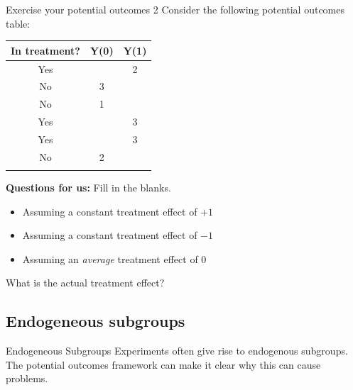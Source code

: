\documentclass[
  11pt,
  ignorenonframetext,
]{beamer}
\providecommand{\tightlist}{%
  \setlength{\itemsep}{0pt}\setlength{\parskip}{0pt}}\usepackage{longtable,booktabs,array}
\begin{document}
\begin{frame}{Exercise your potential outcomes 2}
\protect\hypertarget{exercise-your-potential-outcomes-2}{}
Consider the following potential outcomes table:

\begin{longtable}[]{@{}ccc@{}}
\toprule\noalign{}
In treatment? & Y(0) & Y(1) \\
\midrule\noalign{}
\endhead
Yes & & 2 \\
No & 3 & \\
No & 1 & \\
Yes & & 3 \\
Yes & & 3 \\
No & 2 & \\
\bottomrule\noalign{}
\end{longtable}

\textbf{Questions for us: } Fill in the blanks.

\begin{itemize}
\tightlist
\item
  Assuming a constant treatment effect of \(+1\)
\item
  Assuming a constant treatment effect of \(-1\)
\item
  Assuming an \textit{average} treatment effect of \(0\)
\end{itemize}

What is the actual treatment effect?
\end{frame}

\hypertarget{endogeneous-subgroups}{%
\subsection{\texorpdfstring{Endogeneous subgroups
\label{subs}}{Endogeneous subgroups }}\label{endogeneous-subgroups}}

\begin{frame}{Endogeneous Subgroups}
\protect\hypertarget{endogeneous-subgroups-1}{}
Experiments often give rise to endogenous subgroups. The potential
outcomes framework can make it clear why this can cause problems.
\end{frame}
\end{document}
